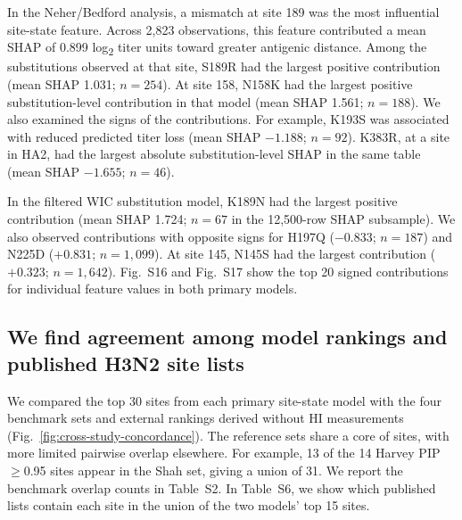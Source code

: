 \documentclass[12pt]{article}
\begin{document}
In the Neher/Bedford analysis, a mismatch at site 189 was the most influential site-state feature. Across 2{,}823 observations, this feature contributed a mean SHAP of 0.899 log\textsubscript{2} titer units toward greater antigenic distance. Among the substitutions observed at that site, S189R had the largest positive contribution (mean SHAP 1.031; $n=254$). At site 158, N158K had the largest positive substitution-level contribution in that model (mean SHAP 1.561; $n=188$). We also examined the signs of the contributions. For example, K193S was associated with reduced predicted titer loss (mean SHAP $-1.188$; $n=92$). K383R, at a site in HA2, had the largest absolute substitution-level SHAP in the same table (mean SHAP $-1.655$; $n=46$).

In the filtered WIC substitution model, K189N had the largest positive contribution (mean SHAP 1.724; $n=67$ in the 12{,}500-row SHAP subsample). We also observed contributions with opposite signs for H197Q ($-0.833$; $n=187$) and N225D ($+0.831$; $n=1{,}099$). At site 145, N145S had the largest contribution ($+0.323$; $n=1{,}642$). Fig.~S16 and Fig.~S17 show the top 20 signed contributions for individual feature values in both primary models.

\subsection{We find agreement among model rankings and published H3N2 site lists}

We compared the top 30 sites from each primary site-state model with the four benchmark sets and external rankings derived without HI measurements (Fig.~\ref{fig:cross-study-concordance}). The reference sets share a core of sites, with more limited pairwise overlap elsewhere. For example, 13 of the 14 Harvey PIP~$\geq$0.95 sites appear in the Shah set, giving a union of 31. We report the benchmark overlap counts in Table~S2. In Table~S6, we show which published lists contain each site in the union of the two models' top 15 sites.
\end{document}
